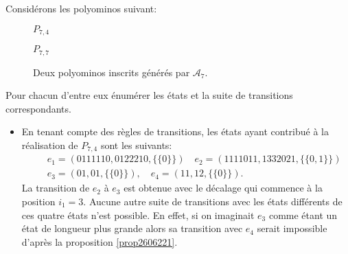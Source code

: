 \begin{Ex}
 Considérons les polyominos suivant:
 \begin{figure}[!htb]
\begin{minipage}[c]{.46\linewidth}
  \centering
\begin{logicpuzzle}[rows=4,columns=7,color=cyan!100, width=750px,scale=0.5]
\framepuzzle[black!50]
\end{logicpuzzle}
$P_{7,4}$\quad\quad\quad\quad\quad\quad\quad
\end{minipage} \hfill 
\begin{minipage}[c]{.46\linewidth}
  \centering
\begin{logicpuzzle}[rows=7,columns=7,color=cyan!100, width=750px,scale=0.5]
\framepuzzle[black!50]
\end{logicpuzzle}
$P_{7,7}$\quad\quad\quad\quad\quad\quad\quad
\end{minipage} \hfill 
\caption{\label{Atfigexo1} Deux polyominos inscrits générés par $\mathcal{A}_{7}$.}
\end{figure}
Pour chacun d'entre eux énumérer  les états et la suite de transitions correspondants.
\begin{itemize}
\item En tenant compte des règles de transitions, les états ayant contribué à la réalisation de $P_{7,4}$ sont les suivants:
\begin{eqnarray*}
& & e_{1}= (0111110,0122210,\{\{0\}\}) \quad e_{2}= (1111011,1332021,\{\{0,1\}\})\\
& & e_{3}= (01,01,\{\{0\}\}),\quad e_{4}= (11,12,\{\{0\}\}).
\end{eqnarray*}
La transition de  $e_{2}$ à $e_{3}$ est  obtenue avec le décalage qui commence à la position $i_{1}=3$. Aucune autre suite de transitions  avec les états différents de ces quatre états  n'est possible. En effet, si on imaginait $e_{3}$  comme étant un état de longueur  plus grande alors sa transition avec $e_{4}$ serait impossible d'après la proposition \ref{prop2606221}.


\end{itemize}
\end{Ex}
